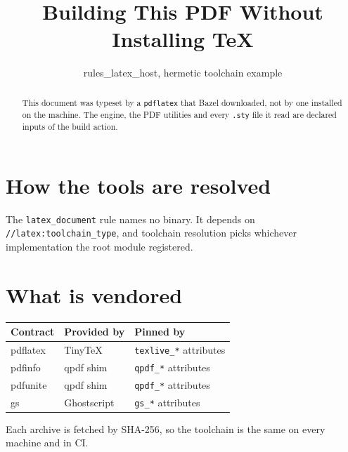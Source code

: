 \documentclass[journal,9pt]{IEEEtran}
\begin{document}
\title{Building This PDF Without Installing \TeX}
\author{rules\_latex\_host, hermetic toolchain example}
\maketitle

\begin{abstract}
This document was typeset by a \texttt{pdflatex} that Bazel downloaded, not by
one installed on the machine. The engine, the PDF utilities and every
\texttt{.sty} file it read are declared inputs of the build action.
\end{abstract}

\section{How the tools are resolved}

The \texttt{latex\_document} rule names no binary. It depends on
\texttt{//latex:toolchain\_type}, and toolchain resolution picks whichever
implementation the root module registered.



\section{What is vendored}

\begin{table}[h]
\centering
\begin{tabular}{@{}lll@{}}
\toprule
Contract   & Provided by   & Pinned by \\
\midrule
pdflatex   & TinyTeX       & \texttt{texlive\_*} attributes \\
pdfinfo    & qpdf shim     & \texttt{qpdf\_*} attributes \\
pdfunite   & qpdf shim     & \texttt{qpdf\_*} attributes \\
gs         & Ghostscript   & \texttt{gs\_*} attributes \\
\bottomrule
\end{tabular}
\end{table}

Each archive is fetched by SHA-256, so the toolchain is the same on every
machine and in CI.
\end{document}
